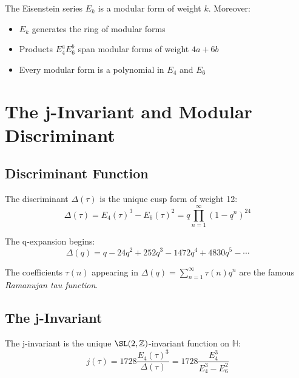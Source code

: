 \begin{theorem}
The Eisenstein series $E_k$ is a modular form of weight $k$. Moreover:
\begin{itemize}
    \item $E_k$ generates the ring of modular forms
    \item Products $E_4^a E_6^b$ span modular forms of weight $4a + 6b$
    \item Every modular form is a polynomial in $E_4$ and $E_6$
\end{itemize}
\end{theorem}

\section{The j-Invariant and Modular Discriminant}

\subsection{Discriminant Function}

\begin{definition}
The discriminant $\Delta(\tau)$ is the unique cusp form of weight 12:
\begin{equation}
    \Delta(\tau) = E_4(\tau)^3 - E_6(\tau)^2 = q \prod_{n=1}^{\infty} (1 - q^n)^{24}
\end{equation}
\end{definition}

The q-expansion begins:
\begin{equation}
    \Delta(q) = q - 24q^2 + 252q^3 - 1472q^4 + 4830q^5 - \cdots
\end{equation}

The coefficients $\tau(n)$ appearing in $\Delta(q) = \sum_{n=1}^{\infty} \tau(n) q^n$ are the famous \textit{Ramanujan tau function}.

\subsection{The j-Invariant}

\begin{definition}
The j-invariant is the unique $\SL(2,\mathbb{Z})$-invariant function on $\mathbb{H}$:
\begin{equation}
    j(\tau) = 1728 \frac{E_4(\tau)^3}{\Delta(\tau)} = 1728 \frac{E_4^3}{E_4^3 - E_6^2}
\end{equation}
\end{definition}

